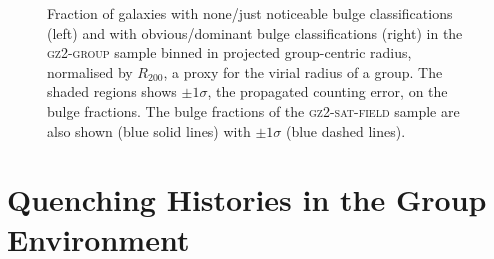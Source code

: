 \documentclass[useAMS,usenatbib]{mn2e}
\begin{document}
\begin{figure}
\caption[Bulge fraction with group radius in the \textsc{gz2-group} sample]{Fraction of galaxies with none/just noticeable bulge classifications (left) and with obvious/dominant bulge classifications (right) in the \textsc{gz2-group} sample binned in projected group-centric radius, normalised by $R_{200}$, a proxy for the virial radius of a group. The shaded regions shows $\pm1\sigma$, the propagated counting error, on the bulge fractions. The bulge fractions of the \textsc{gz2-sat-field} sample are also shown (blue solid lines) with $\pm1\sigma$ (blue dashed lines).}
\label{fig:bulgeradius}
\end{figure}


\section{Quenching Histories in the Group Environment}\label{sec:starpy}
\end{document}
